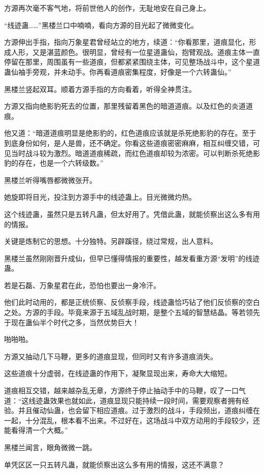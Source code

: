 \begin{this_body}
方源再次毫不客气地，将前世他人的创作，无耻地安在自己身上。

“线迹蛊……”黑楼兰口中喃喃，看向方源的目光起了微微变化。

方源伸出手指，指向万象星君曾经站立的地方，续道：“你看那里，道痕显化，形成人形，又是湛蓝颜色。很明显，曾经有一位星道蛊仙，抱臂观战。道痕主体一直停留在那里，周围虽有一些道痕，但都紧紧围绕主体，可见整场战斗中，这个星道蛊仙袖手旁观，并未动手。你再看道痕密集程度，好像是一个六转蛊仙。”

黑楼兰竖起双耳。顺着方源手指的方向看着，听得全神贯注。

方源又指向绝影豹死去的位置，那里残留着黑色的暗道道痕。以及红色的炎道道痕。

他又道：“暗道道痕明显是绝影豹的，红色道痕应该就是杀死绝影豹的存在。至于到底身份如何，是人是兽，还不确定。你看这些道痕密密麻麻，相互纠缠交错，可见当时战斗较为激烈。暗道道痕稀疏，而红色道痕却较为浓密。可以判断杀死绝影豹的存在，也是一个六转级数。”

黑楼兰听得嘴唇都微微张开。

她旋即将目光，投注到方源手中的线迹蛊上。目光微微灼热。

这个线迹蛊，虽然只是五转凡蛊，但太好用了。凭借此蛊，就能侦察出这么多有用的情报。

关键是炼制它的思想。十分独特。另辟蹊径，绕过常规，出人意料。

黑楼兰虽然刚刚晋升成仙，但早已懂得情报的重要性，越发看重方源“发明”的线迹蛊。

若是石磊、万象星君在此，恐怕也要出一身冷汗。

他们此时动用的，都是正统侦察、反侦察手段，线迹蛊恰巧钻了他们反侦察的空白之处。方源的手段。毕竟来源于五域乱战时期，是整个五域的智慧结晶。等若领先于现在蛊仙半个时代之多，当然优势巨大！

啪啪啪。

方源又抽动几下马鞭，更多的道痕显现，但同时又有许多道痕消失。

这些道痕十分虚弱，在线迹蛊的作用下，凝聚显现出来，寿命大大缩短。

道痕相互交错，越来越杂乱无章，方源终于停止抽动手中的马鞭，叹了一口气道：“这线迹蛊效果也就如此，道痕显现只能持续一段时间，需要观察者拥有经验。并且催动仙蛊，也会留下相应道痕。过于激烈的战斗，手段频出，道痕纠缠在一起，十分混乱，根本看不出来。不过好在，这场战斗中双方动用的手段较少，还能看得清一个大概。”

黑楼兰闻言，眼角微微一跳。

单凭区区一只五转凡蛊，就能侦察出这么多有用的情报，这还不满意？


\end{this_body}
